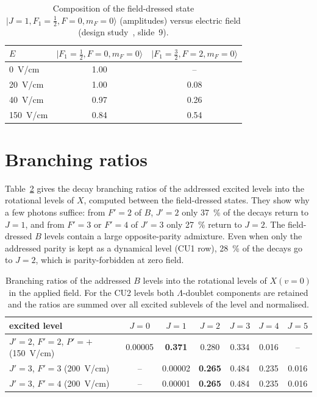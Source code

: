 \documentclass[11pt,a4paper,oneside]{report}
\begin{document}
\begin{table}[htbp]
  \centering
  \caption[Field mixing of the $J=1$, $F=0$ ground state]{Composition of the field-dressed
  state $|J=1,F_1=\tfrac12,F=0,m_F=0\rangle$ (amplitudes) versus electric field
  (design study~\cite{CleanupTheory2024}, slide~9).}
  \label{tab:f0mix}
  \small
  \begin{tabular}{lcc}
    \toprule
    $E$ & $|F_1=\tfrac12,F=0,m_F=0\rangle$ & $|F_1=\tfrac32,F=2,m_F=0\rangle$ \\
    \midrule
    \SI{0}{V/cm} & 1.00 & -- \\
    \SI{20}{V/cm} & 1.00 & 0.08 \\
    \SI{40}{V/cm} & 0.97 & 0.26 \\
    \SI{150}{V/cm} & 0.84 & 0.54 \\
    \bottomrule
  \end{tabular}
\end{table}

\section{Branching ratios}

Table~\ref{tab:br} gives the decay branching ratios of the addressed excited levels into the
rotational levels of $X$, computed between the field-dressed states. They show why a few
photons suffice: from $F'=2$ of $B$, $J'=2$ only \SI{37}{\percent} of the decays return to
$J=1$, and from $F'=3$ or $F'=4$ of $J'=3$ only \SI{27}{\percent} return to $J=2$. The
field-dressed $B$ levels contain a large opposite-parity admixture. Even when only the
addressed parity is kept as a dynamical level (CU1 row), \SI{28}{\percent} of the decays go
to $J=2$, which is parity-forbidden at zero field.

\begin{table}[htbp]
  \centering
  \caption[Branching ratios]{Branching ratios of the addressed $B$ levels into the
  rotational levels of $X(v{=}0)$ in the applied field. For the CU2 levels both
  $\Lambda$-doublet components are retained and the ratios are summed over all excited
  sublevels of the level and normalised.}
  \label{tab:br}
  \small
  \begin{tabular}{lcccccc}
    \toprule
    excited level & $J=0$ & $J=1$ & $J=2$ & $J=3$ & $J=4$ & $J=5$ \\
    \midrule
    $J'=2$, $F'=2$, $P'=+$ (\SI{150}{V/cm}) & 0.00005 & \textbf{0.371} & 0.280 & 0.334 & 0.016 & -- \\
    $J'=3$, $F'=3$ (\SI{200}{V/cm}) & -- & 0.00002 & \textbf{0.265} & 0.484 & 0.235 & 0.016 \\
    $J'=3$, $F'=4$ (\SI{200}{V/cm}) & -- & 0.00001 & \textbf{0.265} & 0.484 & 0.235 & 0.016 \\
    \bottomrule
  \end{tabular}
\end{table}
\end{document}
